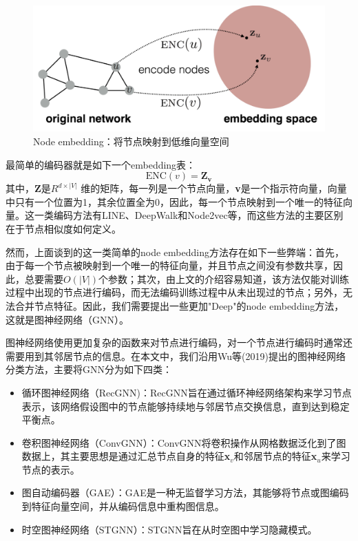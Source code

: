 \begin{figure}[!htbp]
  \centering
  \includegraphics[width=\textwidth]{Fig/nodeem.pdf}
  \caption{Node embedding：将节点映射到低维向量空间}
  \label{fig:nodeed}
\end{figure}

最简单的编码器就是如下一个embedding表：
\[\text{ENC}(v) = \textbf{Z}_\textbf{v}\]
其中，$\textbf{Z}$是$R^{d\times |V|}$ 维的矩阵，每一列是一个节点向量，\textbf{v}是一个指示符向量，向量中只有一个位置为1，其余位置全为0，因此，每一个节点映射到一个唯一的特征向量。这一类编码方法有LINE\cite{tang2015line}、DeepWalk\cite{perozzi2014deepwalk}和Node2vec\cite{grover2016node2vec}等，而这些方法的主要区别在于节点相似度如何定义。

然而，上面谈到的这一类简单的node embedding方法存在如下一些弊端：首先，由于每一个节点被映射到一个唯一的特征向量，并且节点之间没有参数共享，因此，总要需要$O(|V|)$个参数；其次，由上文的介绍容易知道，该方法仅能对训练过程中出现的节点进行编码，而无法编码训练过程中从未出现过的节点；另外，无法合并节点特征。因此，我们需要提出一些更加"Deep"的node embedding方法，这就是图神经网络（GNN）。

图神经网络使用更加复杂的函数来对节点进行编码，对一个节点进行编码时通常还需要用到其邻居节点的信息。在本文中，我们沿用Wu等(2019)\cite{wu2019comprehensive}提出的图神经网络分类方法，主要将GNN分为如下四类：
\begin{itemize}
  \item 循环图神经网络（RecGNN)：RecGNN旨在通过循环神经网络架构来学习节点表示，该网络假设图中的节点能够持续地与邻居节点交换信息，直到达到稳定平衡点。
\item 卷积图神经网络（ConvGNN）：ConvGNN将卷积操作从网格数据泛化到了图数据上，其主要思想是通过汇总节点自身的特征\textbf{x}$_v$和邻居节点的特征\textbf{x}$_u$来学习节点的表示。
  \item 图自动编码器（GAE）：GAE是一种无监督学习方法，其能够将节点或图编码到特征向量空间，并从编码信息中重构图信息。
	\item 时空图神经网络（STGNN）：STGNN旨在从时空图中学习隐藏模式。
\end{itemize}

